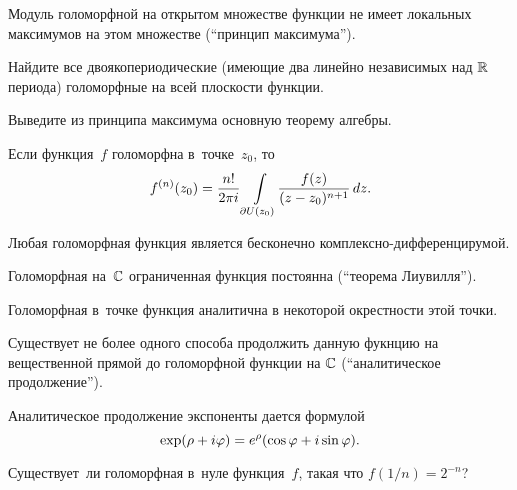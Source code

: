 \documentclass[a4paper, 12pt]{article}
\begin{document}
{}
Модуль голоморфной на открытом множестве функции не имеет локальных максимумов на этом множестве (``принцип максимума'').






Найдите все двоякопериодические (имеющие два линейно независимых над $\mathbb{R}$ периода) голоморфные на всей плоскости функции.






Выведите из принципа максимума основную теорему алгебры.








{}
 Если функция~$f$ голоморфна в~точке~$z_0$, то
\[
\abovedisplayskip=9pt
\belowdisplayskip=7pt
f^{(n)}(z_0)=
\frac{n!}{2\pi i}\int\limits_{\partial U(z_0)}
\!\frac{f(z)}{(z-z_0)^{n+1}}\,dz.
\]

 Любая голоморфная функция является бесконечно комплексно-дифференцирумой.






Голоморфная на~$\mathbb{C}$ ограниченная функция постоянна (``теорема Лиувилля'').






Голоморфная в~точке функция аналитична в некоторой окрестности этой точки.
%






Существует не более одного способа продолжить данную фукнцию на вещественной прямой до голоморфной функции на $\mathbb{C}$ (``аналитическое продолжение'').






Аналитическое продолжение экспоненты дается формулой
\[
\abovedisplayskip=6pt
\exp(\rho+i\varphi)=e^\rho(\cos\varphi+i\sin\varphi).
\]






Существует~ли голоморфная в~нуле функция~$f$, такая что $f(1/n)=2^{-n}$?











\end{document}
